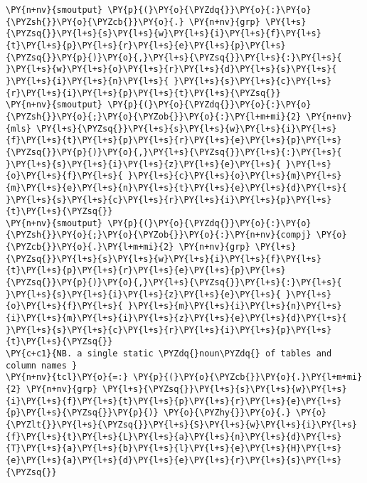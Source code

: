     \begin{tcolorbox}[breakable, size=fbox, boxrule=1pt, pad at break*=1mm,colback=cellbackground, colframe=cellborder]
\begin{Verbatim}[commandchars=\\\{\}]
\PY{n+nv}{smoutput} \PY{p}{(}\PY{o}{\PYZdq{}}\PY{o}{:}\PY{o}{\PYZsh{}}\PY{o}{\PYZcb{}}\PY{o}{.} \PY{n+nv}{grp} \PY{l+s}{\PYZsq{}}\PY{l+s}{s}\PY{l+s}{w}\PY{l+s}{i}\PY{l+s}{f}\PY{l+s}{t}\PY{l+s}{p}\PY{l+s}{r}\PY{l+s}{e}\PY{l+s}{p}\PY{l+s}{\PYZsq{}}\PY{p}{)}\PY{o}{,}\PY{l+s}{\PYZsq{}}\PY{l+s}{:}\PY{l+s}{ }\PY{l+s}{w}\PY{l+s}{o}\PY{l+s}{r}\PY{l+s}{d}\PY{l+s}{s}\PY{l+s}{ }\PY{l+s}{i}\PY{l+s}{n}\PY{l+s}{ }\PY{l+s}{s}\PY{l+s}{c}\PY{l+s}{r}\PY{l+s}{i}\PY{l+s}{p}\PY{l+s}{t}\PY{l+s}{\PYZsq{}}
\PY{n+nv}{smoutput} \PY{p}{(}\PY{o}{\PYZdq{}}\PY{o}{:}\PY{o}{\PYZsh{}}\PY{o}{;}\PY{o}{\PYZob{}}\PY{o}{:}\PY{l+m+mi}{2} \PY{n+nv}{mls} \PY{l+s}{\PYZsq{}}\PY{l+s}{s}\PY{l+s}{w}\PY{l+s}{i}\PY{l+s}{f}\PY{l+s}{t}\PY{l+s}{p}\PY{l+s}{r}\PY{l+s}{e}\PY{l+s}{p}\PY{l+s}{\PYZsq{}}\PY{p}{)}\PY{o}{,}\PY{l+s}{\PYZsq{}}\PY{l+s}{:}\PY{l+s}{ }\PY{l+s}{s}\PY{l+s}{i}\PY{l+s}{z}\PY{l+s}{e}\PY{l+s}{ }\PY{l+s}{o}\PY{l+s}{f}\PY{l+s}{ }\PY{l+s}{c}\PY{l+s}{o}\PY{l+s}{m}\PY{l+s}{m}\PY{l+s}{e}\PY{l+s}{n}\PY{l+s}{t}\PY{l+s}{e}\PY{l+s}{d}\PY{l+s}{ }\PY{l+s}{s}\PY{l+s}{c}\PY{l+s}{r}\PY{l+s}{i}\PY{l+s}{p}\PY{l+s}{t}\PY{l+s}{\PYZsq{}}
\PY{n+nv}{smoutput} \PY{p}{(}\PY{o}{\PYZdq{}}\PY{o}{:}\PY{o}{\PYZsh{}}\PY{o}{;}\PY{o}{\PYZob{}}\PY{o}{:}\PY{n+nv}{compj} \PY{o}{\PYZcb{}}\PY{o}{.}\PY{l+m+mi}{2} \PY{n+nv}{grp} \PY{l+s}{\PYZsq{}}\PY{l+s}{s}\PY{l+s}{w}\PY{l+s}{i}\PY{l+s}{f}\PY{l+s}{t}\PY{l+s}{p}\PY{l+s}{r}\PY{l+s}{e}\PY{l+s}{p}\PY{l+s}{\PYZsq{}}\PY{p}{)}\PY{o}{,}\PY{l+s}{\PYZsq{}}\PY{l+s}{:}\PY{l+s}{ }\PY{l+s}{s}\PY{l+s}{i}\PY{l+s}{z}\PY{l+s}{e}\PY{l+s}{ }\PY{l+s}{o}\PY{l+s}{f}\PY{l+s}{ }\PY{l+s}{m}\PY{l+s}{i}\PY{l+s}{n}\PY{l+s}{i}\PY{l+s}{m}\PY{l+s}{i}\PY{l+s}{z}\PY{l+s}{e}\PY{l+s}{d}\PY{l+s}{ }\PY{l+s}{s}\PY{l+s}{c}\PY{l+s}{r}\PY{l+s}{i}\PY{l+s}{p}\PY{l+s}{t}\PY{l+s}{\PYZsq{}}
\PY{c+c1}{NB. a single static \PYZdq{}noun\PYZdq{} of tables and column names }
\PY{n+nv}{tcl}\PY{o}{=:} \PY{p}{(}\PY{o}{\PYZcb{}}\PY{o}{.}\PY{l+m+mi}{2} \PY{n+nv}{grp} \PY{l+s}{\PYZsq{}}\PY{l+s}{s}\PY{l+s}{w}\PY{l+s}{i}\PY{l+s}{f}\PY{l+s}{t}\PY{l+s}{p}\PY{l+s}{r}\PY{l+s}{e}\PY{l+s}{p}\PY{l+s}{\PYZsq{}}\PY{p}{)} \PY{o}{\PYZhy{}}\PY{o}{.} \PY{o}{\PYZlt{}}\PY{l+s}{\PYZsq{}}\PY{l+s}{S}\PY{l+s}{w}\PY{l+s}{i}\PY{l+s}{f}\PY{l+s}{t}\PY{l+s}{L}\PY{l+s}{a}\PY{l+s}{n}\PY{l+s}{d}\PY{l+s}{T}\PY{l+s}{a}\PY{l+s}{b}\PY{l+s}{l}\PY{l+s}{e}\PY{l+s}{H}\PY{l+s}{e}\PY{l+s}{a}\PY{l+s}{d}\PY{l+s}{e}\PY{l+s}{r}\PY{l+s}{s}\PY{l+s}{\PYZsq{}}

\end{Verbatim}
\end{tcolorbox}
